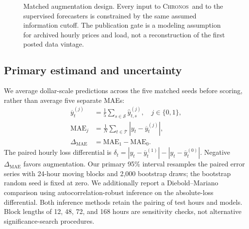 \documentclass[11pt,letterpaper]{article}
\newcommand{\MAE}{\ensuremath{\mathrm{MAE}}}
\newcommand{\Chronos}{\textsc{Chronos}}
\newcommand{\XGB}{\textsc{XGBoost}}
\begin{document}
\begin{figure}[t]
\centering
{}
\caption{Matched augmentation design. Every input to \Chronos\ and to the supervised forecasters is constrained by the same assumed information cutoff. The publication gate is a modeling assumption for archived hourly prices and load, not a reconstruction of the first posted data vintage.}\label{fig:design}
\end{figure}

\subsection{Primary estimand and uncertainty}\label{subsec:inference}
We average dollar-scale predictions across the five matched seeds before scoring, rather than average five separate MAEs:
\begin{align}
 \overline y_t^{(j)} &= \frac15\sum_{s\in\mathcal S}\hat y^{(j)}_{t,s}, \quad j\in\{0,1\},\\
 \MAE_j &=\frac1N\sum_{t\in\mathcal T}\left|y_t-\overline y_t^{(j)}\right|,\\
 \Delta_{\MAE} &= \MAE_1-\MAE_0. \label{eq:estimand}
\end{align}
The paired hourly loss differential is $\delta_t=|y_t-\overline y_t^{(1)}|-|y_t-\overline y_t^{(0)}|$. Negative $\Delta_{\MAE}$ favors augmentation. Our primary 95\% interval resamples the paired error series with 24-hour moving blocks and 2,000 bootstrap draws; the bootstrap random seed is fixed at zero. We additionally report a Diebold--Mariano comparison using autocorrelation-robust inference on the absolute-loss differential. Both inference methods retain the pairing of test hours and models. Block lengths of 12, 48, 72, and 168 hours are sensitivity checks, not alternative significance-search procedures.
\end{document}
